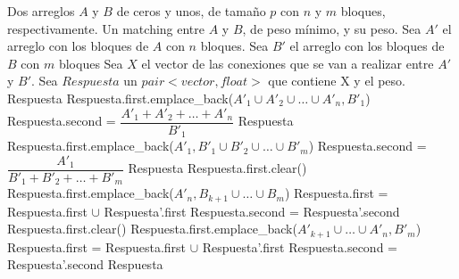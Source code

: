 \documentclass[12pt,a4,paper]{article}
\begin{document}
\begin{algorithmic}[1]
    \REQUIRE Dos arreglos $A$ y $B$ de ceros y unos, de tamaño $p$ con $n$ y $m$ bloques, respectivamente.
    \ENSURE Un matching entre $A$ y $B$, de peso mínimo, y su peso. \newline \newline
        \STATE Sea $A'$ el arreglo con los bloques de $A$ con $n$ bloques.
        \STATE Sea $B'$ el arreglo con los bloques de $B$ con $m$ bloques
        \STATE Sea $X$ el vector de las conexiones que se van a realizar entre $A'$ y $B'$.
        \STATE Sea $Respuesta$ un $pair<vector, float>$ que contiene X y el peso.
            \RETURN Respuesta
        \ENDIF
        \STATE
            \STATE Respuesta.first.emplace\_back($A'_1\cup A'_2\cup \ldots \cup A'_n, B'_1$)
            \STATE Respuesta.second = $\dfrac{A'_1+A'_2+\ldots +A'_n}{B'_1}$
            \RETURN Respuesta
        \ENDIF
        \STATE
            \STATE Respuesta.first.emplace\_back($A'_1, B'_1\cup B'_2\cup \ldots \cup B'_m$)
            \STATE Respuesta.second = $\dfrac{A'_1}{B'_1+B'_2+\ldots +B'_m}$
            \RETURN Respuesta
        \ENDIF
        \STATE
         
             
                \STATE Respuesta.first.clear()
                \STATE Respuesta.first.emplace\_back($A'_n, B_{k+1}\cup \ldots\cup B_m$)
                \STATE Respuesta.first = Respuesta.first $\cup$ Respuesta'.first
                \STATE Respuesta.second = Respuesta'.second
            \ENDIF
        \ENDFOR
        \STATE
         
             
                \STATE Respuesta.first.clear()
                \STATE Respuesta.first.emplace\_back($A'_{k+1} \cup  \ldots \cup A'_n, B'_m$)
                \STATE Respuesta.first = Respuesta.first $\cup$  Respuesta'.first
                \STATE Respuesta.second = Respuesta'.second
            \ENDIF
        \ENDFOR
        \STATE
        \RETURN Respuesta
\end{algorithmic}
\end{document}
